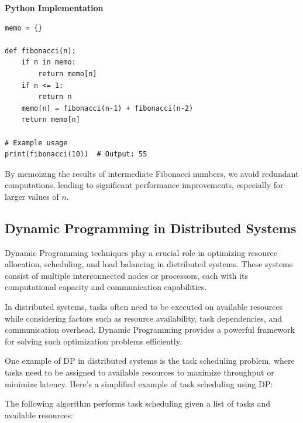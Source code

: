 \documentclass[12pt]{book} %
\begin{document}
\textbf{Python Implementation}
\begin{lstlisting}
memo = {}

def fibonacci(n):
    if n in memo:
        return memo[n]
    if n <= 1:
        return n
    memo[n] = fibonacci(n-1) + fibonacci(n-2)
    return memo[n]

# Example usage
print(fibonacci(10))  # Output: 55
\end{lstlisting}
\FloatBarrier
By memoizing the results of intermediate Fibonacci numbers, we avoid redundant computations, leading to significant performance improvements, especially for larger values of \( n \).



\subsection{Dynamic Programming in Distributed Systems}

Dynamic Programming techniques play a crucial role in optimizing resource allocation, scheduling, and load balancing in distributed systems. These systems consist of multiple interconnected nodes or processors, each with its computational capacity and communication capabilities.

In distributed systems, tasks often need to be executed on available resources while considering factors such as resource availability, task dependencies, and communication overhead. Dynamic Programming provides a powerful framework for solving such optimization problems efficiently.


One example of DP in distributed systems is the task scheduling problem, where tasks need to be assigned to available resources to maximize throughput or minimize latency. Here's a simplified example of task scheduling using DP:

The following algorithm performs task scheduling given a list of tasks and available resources:
\end{document}
